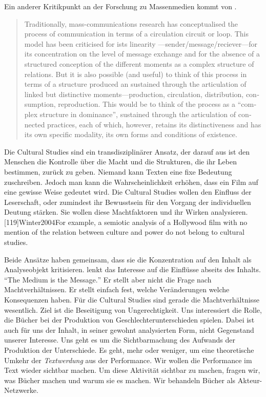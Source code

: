   Ein anderer Kritikpunkt an der Forschung zu Massenmedien kommt von
  .
  \foreignblockcquote{english}[117]{Hall1980}{Traditionally, mass-communications
  research has conceptualised the process of communication in terms of a
  circulation circuit or loop. This model has been criticised for ists linearity
  ---sender/message/reciever---for its concentration on the level of message
  exchange and for the absence of a structured conception of the different
  moments as a complex structure of relations. But it is also possible (and
  useful) to think of this process in terms of a structure produced an sustained
  through the articulation of linked but distinctive moments---production,
  circulation, distribution, consumption, reproduction. This would be to think
  of the process as a \enquote{complex structure in dominance}, sustained
  through the articulation of connected practices, each of which, however,
  retains its distinctiveness and has its own specific modality, its own forms
  and conditions of existence.} Die Cultural Studies sind ein transdisziplinärer
  Ansatz, der darauf aus ist den Menschen die Kontrolle über die Macht und die
  Strukturen, die ihr Leben bestimmen, zurück zu geben. \parencite[2]{Hipfl2004}
  Niemand kann Texten eine fixe Bedeutung zuschreiben. Jedoch man kann die
  Wahrscheinlichkeit erhöhen, dass ein Film auf eine gewisse Weise gedeutet
  wird. Die Cultural Studies wollen den Einfluss der Leserschaft, oder zumindest
  ihr Bewusstsein für den Vorgang der individuellen Deutung stärken.
  \parencite[1:15\,Min.]{Hall2010} Sie wollen diese Machtfaktoren und ihr Wirken
  analysieren. \parencite[29]{Daehnke2003}
  [119]{Winter2004}{For example, a semiotic analysis
  of a Hollywood film \textelp{} with no mention of the relation between culture
  and power do not belong to cultural studies.}

  Beide Ansätze haben gemeinsam, dass sie die Konzentration auf den Inhalt als
  Analyseobjekt kritisieren. \citeauthor{McLuhan2012} lenkt das Interesse auf
  die Einflüsse abseits des Inhalts. \hyphenquote{english}{The Medium is the
  Message.} Er stellt aber nicht die Frage nach Machtverhältnissen. Er stellt
  einfach fest, welche Veränderungen welche Konsequenzen haben. Für die Cultural
  Studies sind gerade die Machtverhältnisse wesentlich. Ziel ist die Beseitigung
  von Ungerechtigkeit. Uns interessiert die Rolle, die Bücher bei der Produktion
  von Geschlechterunterschieden spielen. Dabei ist auch für uns der Inhalt, in
  seiner gewohnt analysierten Form, nicht Gegenstand unserer Interesse. Uns geht
  es um die Sichtbarmachung des Aufwands der Produktion der Unterschiede. Es
  geht, mehr oder weniger, um eine theoretische Umkehr der \emph{Textwerdung}
  aus der Performance. Wir wollen die Performance im Text wieder sichtbar
  machen. Um diese Aktivität sichtbar zu machen, fragen wir, was Bücher machen
  und warum sie es machen. Wir behandeln Bücher als Akteur-Netzwerke.

